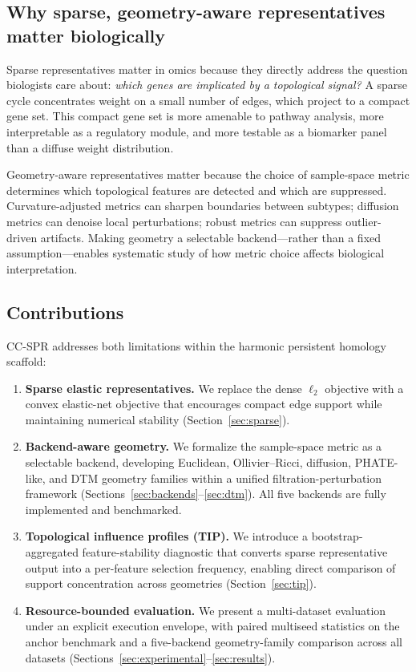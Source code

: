 \documentclass[11pt]{article}
\begin{document}
\subsection{Why sparse, geometry-aware representatives matter biologically}

Sparse representatives matter in omics because they directly address the question biologists care about: \emph{which genes are implicated by a topological signal?}
A sparse cycle concentrates weight on a small number of edges, which project to a compact gene set.
This compact gene set is more amenable to pathway analysis, more interpretable as a regulatory module, and more testable as a biomarker panel than a diffuse weight distribution.

Geometry-aware representatives matter because the choice of sample-space metric determines which topological features are detected and which are suppressed.
Curvature-adjusted metrics can sharpen boundaries between subtypes; diffusion metrics can denoise local perturbations; robust metrics can suppress outlier-driven artifacts.
Making geometry a selectable backend---rather than a fixed assumption---enables systematic study of how metric choice affects biological interpretation.

\subsection{Contributions}

CC-SPR addresses both limitations within the harmonic persistent homology scaffold:
\begin{enumerate}[leftmargin=1.5em]
\item \textbf{Sparse elastic representatives.} We replace the dense $\ell_2$ objective with a convex elastic-net objective that encourages compact edge support while maintaining numerical stability (Section~\ref{sec:sparse}).
\item \textbf{Backend-aware geometry.} We formalize the sample-space metric as a selectable backend, developing Euclidean, Ollivier--Ricci, diffusion, PHATE-like, and DTM geometry families within a unified filtration-perturbation framework (Sections~\ref{sec:backends}--\ref{sec:dtm}).
All five backends are fully implemented and benchmarked.
\item \textbf{Topological influence profiles (TIP).} We introduce a bootstrap-aggregated feature-stability diagnostic that converts sparse representative output into a per-feature selection frequency, enabling direct comparison of support concentration across geometries (Section~\ref{sec:tip}).
\item \textbf{Resource-bounded evaluation.} We present a multi-dataset evaluation under an explicit execution envelope, with paired multiseed statistics on the anchor benchmark and a five-backend geometry-family comparison across all datasets (Sections~\ref{sec:experimental}--\ref{sec:results}).
\end{enumerate}
\end{document}
